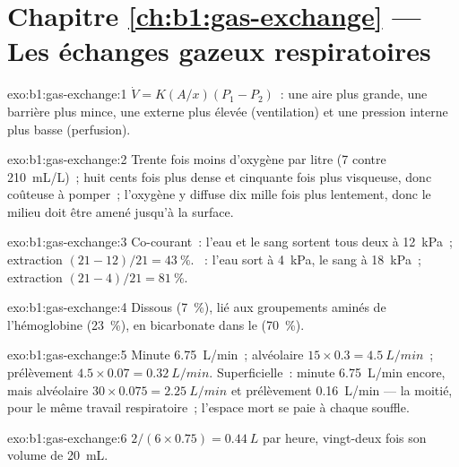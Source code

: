 \section*{Chapitre \ref{ch:b1:gas-exchange} --- Les échanges gazeux respiratoires}

\begin{solution}{exo:b1:gas-exchange:1}
$\dot V = K(A/x)(P_1 - P_2)$~: une aire plus grande, une barrière plus
mince, une  externe plus élevée (ventilation) et une
pression interne plus basse (perfusion).
\end{solution}

\begin{solution}{exo:b1:gas-exchange:2}
Trente fois moins d'oxygène par litre (\qty{7}{} contre
\qty{210}{mL/L})~; huit cents fois plus dense et cinquante fois plus
visqueuse, donc coûteuse à pomper~; l'oxygène y diffuse dix mille fois
plus lentement, donc le milieu doit être amené jusqu'à la surface.
\end{solution}

\begin{solution}{exo:b1:gas-exchange:3}
Co-courant~: l'eau et le sang sortent tous deux à \qty{12}{kPa}~;
extraction $(21 - 12)/21 = \qty{43}{\%}$. ~: l'eau sort
à \qty{4}{kPa}, le sang à \qty{18}{kPa}~; extraction $(21 - 4)/21 =
\qty{81}{\%}$.
\end{solution}

\begin{solution}{exo:b1:gas-exchange:4}
Dissous (\qty{7}{\%}), lié aux groupements aminés de l'hémoglobine
(\qty{23}{\%}), en bicarbonate dans le  (\qty{70}{\%}).
\end{solution}

\begin{solution}{exo:b1:gas-exchange:5}
Minute \qty{6.75}{L/min}~; alvéolaire $15\times 0.3 = \qty{4.5}{L/min}$~;
prélèvement $4.5\times 0.07 = \qty{0.32}{L/min}$. Superficielle~: minute
\qty{6.75}{L/min} encore, mais alvéolaire $30\times 0.075 =
\qty{2.25}{L/min}$ et prélèvement \qty{0.16}{L/min} --- la moitié, pour
le même travail respiratoire~; l'espace mort se paie à chaque souffle.
\end{solution}

\begin{solution}{exo:b1:gas-exchange:6}
$2/(6\times 0.75) = \qty{0.44}{L}$ par heure, vingt-deux fois son
volume de \qty{20}{mL}.
\end{solution}

